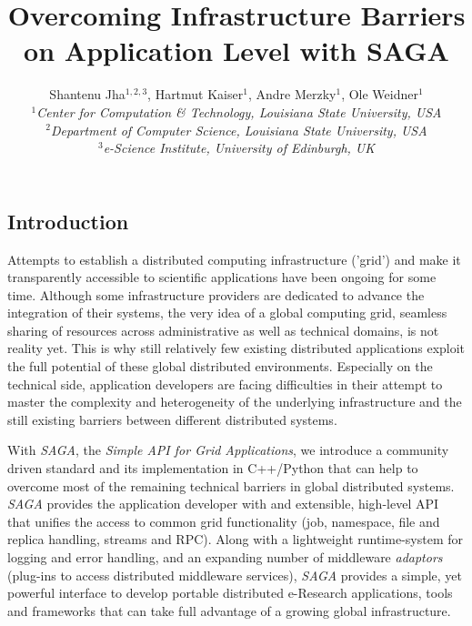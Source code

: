 \documentclass[a4paper,10pt]{article}
\newcommand{\sagaimpl}{\textit{SAGA}\xspace}
\newcommand{\impl}{\sagaimpl}
\newcommand{\jhanote}[1]{  {\textcolor{red}     { ***Shantenu: #1 }}}
\newcommand{\jhanote}[1]{}
\begin{document}
 \title{ \Large \vspace{-3.5em} Overcoming Infrastructure Barriers on Application Level with SAGA }
 
 \author{Shantenu Jha$^{1,2,3}$, Hartmut Kaiser$^{1}$, Andre Merzky$^{1}$, Ole Weidner$^{1}$ \\
   \small{\emph{$^{1}$Center for Computation \& Technology, Louisiana State University, USA}}\\
   \small{\emph{$^{2}$Department of Computer Science, Louisiana State University, USA}}\\
   \small{\emph{$^{3}$e-Science Institute, University of Edinburgh, UK}}
 }
 \date{}
 \maketitle
 




\subsection*{Introduction}
\vspace{-0.6em}

 Attempts to establish a distributed computing infrastructure ('grid')
 and make it transparently accessible to scientific applications have
 been ongoing for some time. Although some infrastructure providers
 are dedicated to advance the integration of their systems, the very
 idea of a global computing grid, seamless sharing of resources across
 administrative as well as technical domains, is not reality yet. This
 is why still relatively few existing distributed applications exploit
 the full potential of these global distributed environments.
 Especially on the technical side, application developers are facing
 difficulties in their attempt to master the complexity and
 heterogeneity of the underlying infrastructure and the still existing
 barriers between different distributed systems.

 With \impl, the \textit{Simple API for Grid Applications}, we
 introduce a community driven standard and its implementation in
 C++/Python that can help to overcome most of the remaining technical
 barriers in global distributed systems. \impl provides the
 application developer with and extensible, high-level API that
 unifies the access to common grid functionality (job, namespace, file
 and replica handling, streams and RPC). Along with a lightweight
 runtime-system for logging and error handling, and an expanding
 number of middleware \textit{adaptors} (plug-ins to access
 distributed middleware services), \impl provides a simple, yet
 powerful interface to develop portable distributed e-Research applications,
 tools and frameworks that can take full advantage of a growing global
 infrastructure.
\end{document}
